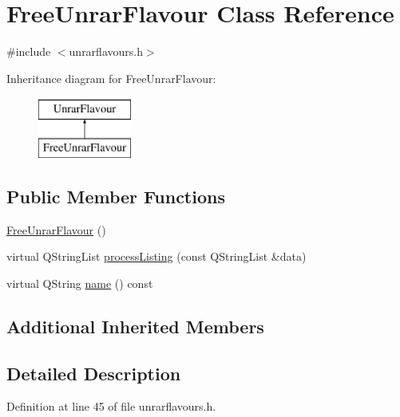 \hypertarget{classFreeUnrarFlavour}{\section{Free\+Unrar\+Flavour Class Reference}
\label{classFreeUnrarFlavour}
}


{\ttfamily \#include $<$unrarflavours.\+h$>$}

Inheritance diagram for Free\+Unrar\+Flavour\+:\begin{figure}[H]
\begin{center}
\leavevmode
\includegraphics[height=2.000000cm]{classFreeUnrarFlavour}
\end{center}
\end{figure}
\subsection*{Public Member Functions}
\begin{DoxyCompactItemize}
\item 
\hyperlink{classFreeUnrarFlavour_ae44074157a056aa703e85ffe52755b95}{Free\+Unrar\+Flavour} ()
\item 
virtual Q\+String\+List \hyperlink{classFreeUnrarFlavour_a2993b09520b7b111ad09a3a456dd4e62}{process\+Listing} (const Q\+String\+List \&data)
\item 
virtual Q\+String \hyperlink{classFreeUnrarFlavour_a209380f3da3f9d4e72631602898c21d7}{name} () const 
\end{DoxyCompactItemize}
\subsection*{Additional Inherited Members}


\subsection{Detailed Description}


Definition at line 45 of file unrarflavours.\+h.



